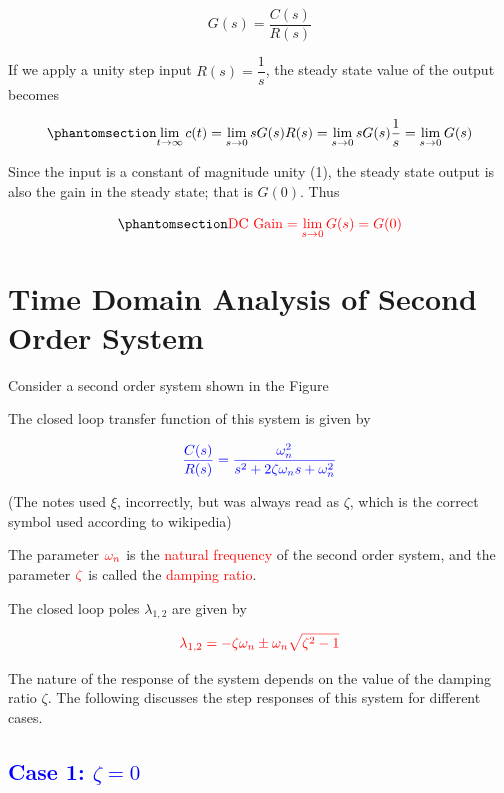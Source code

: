 \documentclass[
  14pt,
  a4paper,
  oneside,
  open=any,
  a4paper,
  14pt]{report}
\begin{document}
\[
    G(s) = \dfrac{C(s)}{R(s)} 
\]

If we apply a unity step input \(R(s) = \dfrac{1}{s}\), the steady state
value of the output becomes

\begin{equation}\phantomsection\label{eq-dc-gain}{
    \lim\limits_{t \to \infty} c(t) = \lim\limits_{s \to 0} sG(s)R(s) = \lim\limits_{s \to 0} sG(s)\dfrac{1}{s} = \lim\limits_{s \to 0} G(s)
}\end{equation}

Since the input is a constant of magnitude unity (1), the steady state
output is also the gain in the steady state; that is \(G(0)\). Thus

\begin{equation}\phantomsection\label{eq-dc-gain-from-ss}{
    \textcolor{red}{\mathrm{DC\ Gain} = \lim\limits_{s \to 0} G(s) = G(0)}
}\end{equation}

\section{Time Domain Analysis of Second Order
System}\label{time-domain-analysis-of-second-order-system}

Consider a second order system shown in the Figure

The closed loop transfer function of this system is given by

\[
    \textcolor{blue}{\dfrac{C(s)}{R(s)}=\dfrac{\omega_n^2}{s^2 + 2\zeta\omega_ns + \omega_n^2}}
\]

(The notes used \(\xi\), incorrectly, but was always read as \(\zeta\),
which is the correct symbol used according to wikipedia)

The parameter \(\textcolor{red}{\omega_n}\) is the
\textcolor{red}{natural frequency} of the second order system, and the
parameter \(\textcolor{red}{\zeta}\) is called the
\textcolor{red}{damping ratio}.

The closed loop poles \(\lambda_{1,2}\) are given by

\[
    \textcolor{red}{\lambda_{1,2} = -\zeta \omega_n \pm \omega_n \sqrt{\zeta^2 - 1}}
\]

The nature of the response of the system depends on the value of the
damping ratio \(\zeta\). The following discusses the step responses of
this system for different cases.

\subsection{\texorpdfstring{\textcolor{blue}{Case 1:
\(\zeta = 0\)}}{Case 1: \textbackslash zeta = 0}}\label{case-1-zeta-0}
\end{document}
